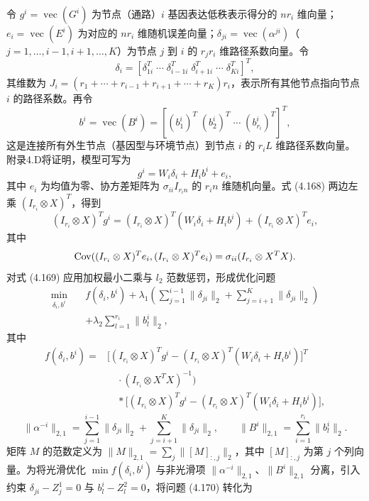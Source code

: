 令 $g^i=\operatorname{vec}(G^i)$ 为节点（通路）$i$ 基因表达低秩表示得分的 $nr_i$ 维向量；$e_i=\operatorname{vec}(E^i)$ 为对应的 $nr_i$ 维随机误差向量；$\delta_{ji}=\operatorname{vec}(\alpha^{ji})$（$j=1,\ldots,i-1,i+1,\ldots,K$）为节点 $j$ 到 $i$ 的 $r_jr_i$ 维路径系数向量。令
\[
\delta_i=[\delta_{1i}^T\;\cdots\;\delta_{i-1i}^T\;\delta_{i+1i}^T\;\cdots\;\delta_{Ki}^T]^T,
\]
其维数为 $J_i=(r_1+\cdots+r_{i-1}+r_{i+1}+\cdots+r_K)r_i$，表示所有其他节点指向节点 $i$ 的路径系数。再令
\[
b^i=\operatorname{vec}(B^i)=[(b_1^i)^T\;(b_2^i)^T\;\cdots\;(b_{r_i}^i)^T]^T,
\]
这是连接所有外生节点（基因型与环境节点）到节点 $i$ 的 $r_iL$ 维路径系数向量。附录4.D将证明，模型可写为
\begin{equation}
g^i=W_i\delta_i+H_ib^i+e_i,
\tag{4.168}
\end{equation}
其中 $e_i$ 为均值为零、协方差矩阵为 $\sigma_{ii}I_{r_in}$ 的 $r_in$ 维随机向量。式 (4.168) 两边左乘 $(I_{r_i}\otimes X)^T$，得到
\begin{equation}
(I_{r_i}\otimes X)^Tg^i
=(I_{r_i}\otimes X)^T(W_i\delta_i+H_ib^i)+(I_{r_i}\otimes X)^Te_i,
\tag{4.169}
\end{equation}
其中
\[
\operatorname{Cov}((I_{r_i}\otimes X)^Te_i,(I_{r_i}\otimes X)^Te_i)
=\sigma_{ii}(I_{r_i}\otimes X^TX).
\]
对式 (4.169) 应用加权最小二乘与 $l_2$ 范数惩罚，形成优化问题
\begin{equation}
\begin{aligned}
\min_{\delta_i,b^i}\quad&f(\delta_i,b^i)
+\lambda_1\left(\sum_{j=1}^{i-1}\lVert\delta_{ji}\rVert_2
+\sum_{j=i+1}^{K}\lVert\delta_{ji}\rVert_2\right)\\
&+\lambda_2\sum_{l=1}^{r_i}\lVert b_l^i\rVert_2,
\end{aligned}
\tag{4.170}
\end{equation}
其中
\[
\begin{aligned}
f(\delta_i,b^i)={}&\bigl[(I_{r_i}\otimes X)^Tg^i
-(I_{r_i}\otimes X)^T(W_i\delta_i+H_ib^i)\bigr]^T\\
&\quad\cdot(I_{r_i}\otimes X^TX)^{-1}\bigr)\\
&\quad*\bigl[(I_{r_i}\otimes X)^Tg^i
-(I_{r_i}\otimes X)^T(W_i\delta_i+H_ib^i)\bigr],
\end{aligned}
\]
\[
\lVert\alpha^{-i}\rVert_{2,1}=\sum_{j=1}^{i-1}\lVert\delta_{ji}\rVert_2
+\sum_{j=i+1}^{K}\lVert\delta_{ji}\rVert_2,\qquad
\lVert B^i\rVert_{2,1}=\sum_{i=1}^{r_i}\lVert b_l^i\rVert_2.
\]
矩阵 $M$ 的范数定义为 $\lVert M\rVert_{2,1}=\sum_j\lVert[M]_{:,j}\rVert_2$，其中 $[M]_{:,j}$ 为第 $j$ 个列向量。为将光滑优化 $\min f(\delta_i,b^i)$ 与非光滑项 $\lVert\alpha^{-i}\rVert_{2,1}$、$\lVert B^i\rVert_{2,1}$ 分离，引入约束 $\delta_{ji}-Z_j^1=0$ 与 $b_l^i-Z_l^2=0$，将问题 (4.170) 转化为
